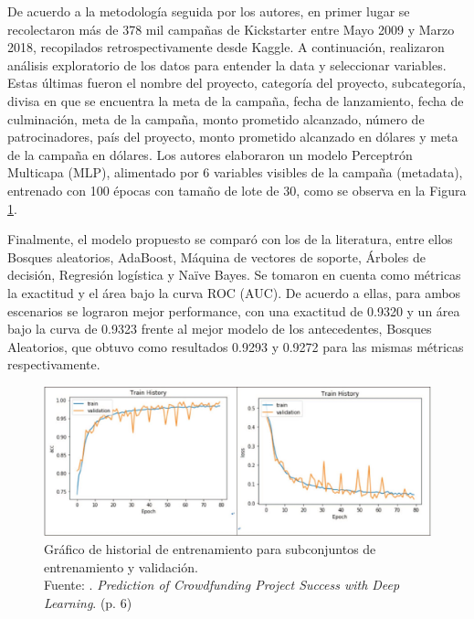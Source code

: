 De acuerdo a la metodología seguida por los autores, en primer lugar se recolectaron más de 378 mil campañas de Kickstarter entre Mayo 2009 y Marzo 2018, recopilados retrospectivamente desde Kaggle. A continuación, realizaron análisis exploratorio de los datos para entender la data y seleccionar variables. Estas últimas fueron el nombre del proyecto, categoría del proyecto, subcategoría, divisa en que se encuentra la meta de la campaña, fecha de lanzamiento, fecha de culminación, meta de la campaña, monto prometido alcanzado, número de patrocinadores, país del proyecto, monto prometido alcanzado en dólares y meta de la campaña en dólares. Los autores elaboraron un modelo Perceptrón Multicapa (MLP), alimentado por 6 variables visibles de la campaña (metadata), entrenado con 100 épocas con tamaño de lote de 30, como se observa en la Figura \ref{2:fig122}.

Finalmente, el modelo propuesto se comparó con los de la literatura, entre ellos Bosques aleatorios, AdaBoost, Máquina de vectores de soporte, Árboles de decisión, Regresión logística y Naïve Bayes.
Se tomaron en cuenta como métricas la exactitud y el área bajo la curva ROC (AUC). De acuerdo a ellas, para ambos escenarios se lograron mejor performance, con una exactitud de 0.9320 y un área bajo la curva de 0.9323 frente al mejor modelo de los antecedentes, Bosques Aleatorios, que obtuvo como resultados 0.9293 y 0.9272 para las mismas métricas respectivamente.

\begin{figure}[!ht]
	\begin{center}
		\includegraphics[width=1\textwidth]{2/figures/yu2018.jpg}
		\caption[Gráfico de historial de entrenamiento para subconjuntos de entrenamiento y validación]{Gráfico de historial de entrenamiento para subconjuntos de entrenamiento y validación.\\
			Fuente: \cite{pr_yu2018deeplearning}. \textit{Prediction of
				Crowdfunding Project Success with Deep Learning}. (p. 6)}
		\label{2:fig122}
	\end{center}
\end{figure}

